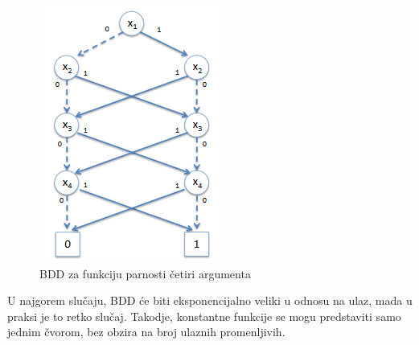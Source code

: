 \begin{figure}[H]
    \centering
    \includegraphics[scale=0.8]{slike/BDD_Parity.PNG}
    \caption{BDD za funkciju parnosti \v{c}etiri argumenta}
    \label{diag:BDDParity}
\end{figure}

U najgorem slu\v{c}aju, BDD \'c{}e biti eksponencijalno veliki u odnosu na ulaz, mada u praksi je to retko slu\v{c}aj. Takodje, konstantne funkcije se mogu predstaviti samo jednim \v{c}vorom, bez obzira na broj ulaznih promenljivih.
